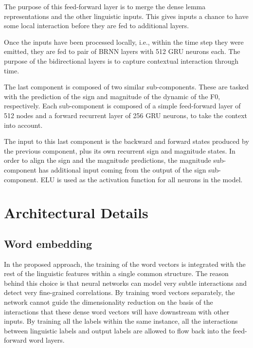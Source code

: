 The purpose of this feed-forward layer is to merge the dense lemma representations and the other linguistic inputs.
This gives inputs a chance to have some local interaction before they are fed to additional layers.

Once the inputs have been processed locally, i.e., within the time step they were emitted, they are fed to pair of \ac{BRNN} layers with 512 \ac{GRU} neurons each.
The purpose of the bidirectional layers is to capture contextual interaction through time.

The last component is composed of two similar sub-components.
These are tasked with the prediction of the sign and magnitude of the dynamic of the \ac{F0}, respectively.
Each sub-component is composed of a simple feed-forward layer of 512 nodes and a forward recurrent layer of 256 \ac{GRU} neurons, to take the context into account.

The input to this last component is the backward and forward states produced by the previous component, plus its own recurrent sign and magnitude states.
In order to align the sign and the magnitude predictions, the magnitude sub-component has additional input coming from the output of the sign sub-component.
ELU \citep{Clevert2015Fast} is used as the activation function for all neurons in the model.






\section{Architectural Details}



\subsection{Word embedding}


In the proposed approach, the training of the word vectors is integrated with the rest of the linguistic features within a single common structure.
The reason behind this choice is that neural networks can model very subtle interactions and detect very fine-grained correlations.
By training word vectors separately, the network cannot guide the dimensionality reduction on the basis of the interactions that these dense word vectors will have downstream with other inputs.
By training all the labels within the same instance, all the interactions between linguistic labels and output labels are allowed to flow back into the feed-forward word layers.

